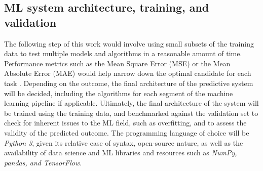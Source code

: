 \documentclass[main.tex]{subfiles}
\begin{document}
\subsection{ML system architecture, training, and validation}\label{ssec:MLA}

The following step of this work would involve using small subsets of the training data to test multiple models and algorithms in a reasonable amount of time. Performance metrics such as the Mean Square Error (MSE) or the Mean Absolute Error (MAE) would help narrow down the optimal candidate for each task \cite{Geron2019}. Depending on the outcome, the final architecture of the predictive system will be decided, including the algorithms for each segment of the machine learning pipeline if applicable. Ultimately, the final architecture of the system will be trained using the training data, and benchmarked against the validation set to check for inherent issues to the ML field, such as overfitting, and to assess the validity of the predicted outcome. The programming language of choice will be \emph{Python 3}, given its relative ease of syntax, open-source nature, as well as the availability of data science and ML libraries and resources such as \emph{NumPy, pandas, and TensorFlow}.


% 
%
%
%
%

\end{document}

